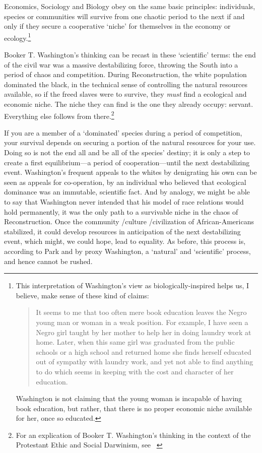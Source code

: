 Economics, Sociology and Biology obey on the same basic principles: individuals, species or communities will survive from one chaotic period to the next if and only if they secure a cooperative `niche' for themselves in the economy or ecology.\footnote{This interpretation of Washington's view as biologically-inspired helps us, I believe, make sense of these kind of claims:

\begin{quote}

It seems to me that too often mere book education leaves the Negro young man or woman in a weak position. For example, I have seen a Negro girl taught by her mother to help her in doing laundry work at home. Later, when this same girl was graduated from the public schools or a high school and returned home she finds herself educated out of sympathy with laundry work, and yet not able to find anything to do which seems in keeping with the cost and character of her education. ~\citep{Washington:1903wa}
\end{quote}

Washington is not claiming that the young woman is incapable of having book education, but rather, that there is no proper economic niche available for her, once so educated.} 

Booker T. Washington's thinking can be recast in these `scientific' terms: the end of the civil war was a massive destabilizing force, throwing the South into a period of chaos and competition. During Reconstruction, the white population dominated the black, in the technical sense of controlling the natural resources available, so if the freed slaves were to survive, they \emph{must} find a ecological and economic niche. The niche they can find is the one they already occupy: servant. Everything else follows from there.\footnote{For an explication of Booker T. Washington's thinking in the context of the Protestant Ethic and Social Darwinism, see ~\citep{Flynn:1969ho}}

If you are a member of a `dominated' species during a period of competition, your survival depends on securing a portion of the natural resources for your use. Doing so is not the end all and be all of the species' destiny; it is only a step to create a first equilibrium---a period of cooperation---until the next destabilizing event. Washington's frequent appeals to the whites by denigrating his own can be seen as appeals for co-operation, by an individual who believed that ecological dominance was an immutable, scientific fact. And by analogy, we might be able to say that Washington never intended that his model of race relations would hold permanently, it was the only path to a survivable niche in the chaos of Reconstruction. Once the community \slash  culture \slash  civilization of African-Americans stabilized, it could develop resources in anticipation of the next destabilizing event, which might, we could hope, lead to equality. As before, this process is, according to Park and by proxy Washington, a `natural' and `scientific' process, and hence cannot be rushed.

